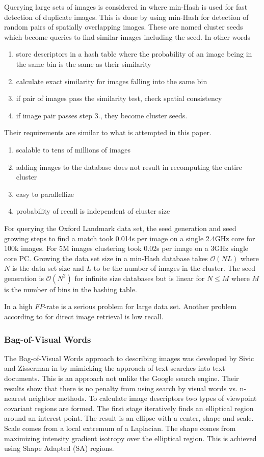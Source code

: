 \documentclass[english,12pt,a4paper,pdftex,elec,utf8, table]{aaltothesis}
\begin{document}
Querying large sets of images is considered in \cite{Chum2010} where min-Hash is used for fast detection of duplicate images. This is done by using min-Hash for detection of random pairs of spatially overlapping images. These are named cluster seeds which become queries to find similar images including the seed. In other words
\begin{enumerate}
\item store descriptors in a hash table where the probability of an image being in the same bin is the same as their similarity
\item calculate exact similarity for images falling into the same bin
\item if pair of images pass the similarity test, check spatial consistency
\item if image pair passes step 3., they become cluster seeds.
\end{enumerate}
Their requirements are similar to what is attempted in this paper.
\begin{enumerate}
\item scalable to tens of millions of images
\item adding images to the database does not result in recomputing the entire cluster
\item easy to parallellize
\item probability of recall is independent of cluster size
\end{enumerate}
For querying the Oxford Landmark data set, the seed generation and seed growing steps to find a match took 0.014s per image on a single 2.4GHz core for 100k images. For 5M images clustering took 0.02s per image on a 3GHz single core PC. Growing the data set size in a min-Hash database takes $\mathcal{O}(NL)$ where $N$ is the data set size and $L$ to be the number of images in the cluster. The seed generation is $\mathcal{O}(N^2)$ for infinite size databases but is linear for $N \leq M$ where $M$ is the number of bins in the hashing table. \cite{Chum2010}

In \cite{Lee2010} a high $FP$-rate is a serious problem for large data set. Another problem according to \cite{Chum2010} for direct image retrieval is low recall.

\subsubsection{Bag-of-Visual Words}\label{BOW}
The Bag-of-Visual Words approach to describing images was developed by Sivic and Zisserman in \cite{Sivic2003} by mimicking the approach of text searches into text documents. This is an approach not unlike the Google search engine. Their results show that there is no penalty from using search by visual words vs. n-nearest neighbor methods. To calculate image descriptors two types of viewpoint covariant regions are formed. The first stage iteratively finds an elliptical region around an interest point. The result is an ellipse with a center, shape and scale. Scale comes from a local extremum of a Laplacian. The shape comes from maximizing intensity gradient isotropy over the elliptical region. This is achieved using Shape Adapted (SA) regions.
\end{document}
